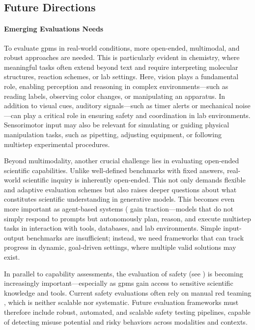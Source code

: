 \subsection{Future Directions} \label{sec:evals-future}

\paragraph{Emerging Evaluations Needs} To evaluate \glspl{gpm} in real-world conditions, more open-ended, multimodal, and robust approaches are needed. This is particularly evident in chemistry, where meaningful tasks often extend beyond text and require interpreting molecular structures, reaction schemes, or lab settings.
Here, vision plays a fundamental role, enabling perception and reasoning in complex environments---such as reading labels, observing color changes, or manipulating an apparatus. \autocite{Eppel2020computer}
In addition to visual cues, auditory signals---such as timer alerts or mechanical noise---can play a critical role in ensuring safety and coordination in lab environments. 
Sensorimotor input may also be relevant for simulating or guiding physical manipulation tasks, such as pipetting, adjusting equipment, or following multistep experimental procedures.


Beyond multimodality, another crucial challenge lies in evaluating open-ended scientific capabilities. 
Unlike well-defined benchmarks with fixed answers, real-world scientific inquiry is inherently open-ended.\autocite{mitchener2025bixbench0} This not only demands flexible and adaptive evaluation schemes but also raises deeper questions about what constitutes scientific understanding in generative models. 
This becomes even more important as agent-based systems ( gain traction---models that do not simply respond to prompts but autonomously plan, reason, and execute multistep tasks in interaction with tools, databases, and lab environments. \autocite{cao2024agents, mandal2024autonomous}
Simple input-output benchmarks are insufficient; instead, we need frameworks that can track progress in dynamic, goal-driven settings, where multiple valid solutions may exist. \autocite{nie2025assessing} 

In parallel to capability assessments, the evaluation of safety (see ) is becoming increasingly important---especially as \glspl{gpm} gain access to sensitive scientific knowledge and tools.\autocite{bran2024augmenting, boiko2023autonomous} 
Current safety evaluations often rely on manual red teaming , which is neither scalable nor systematic. 
Future evaluation frameworks must therefore include robust, automated, and scalable safety testing pipelines, capable of detecting misuse potential and risky behaviors across modalities and contexts.\autocite{goldstein2023generative}

